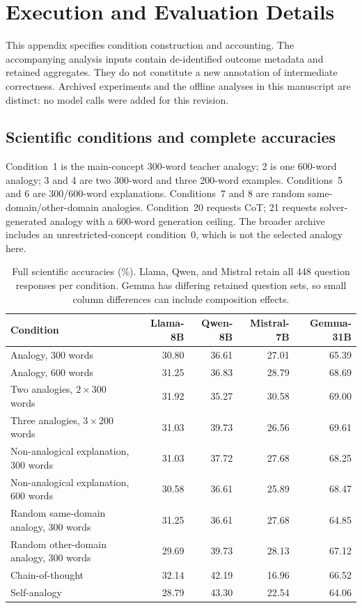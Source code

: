 \section{Execution and Evaluation Details}
\label{app:execution}
This appendix specifies condition construction and accounting. The accompanying analysis inputs contain de-identified outcome metadata and retained aggregates. They do not constitute a new annotation of intermediate correctness. Archived experiments and the offline analyses in this manuscript are distinct: no model calls were added for this revision.

\subsection{Scientific conditions and complete accuracies}
Condition~1 is the main-concept 300-word teacher analogy; 2 is one 600-word analogy; 3 and 4 are two 300-word and three 200-word examples. Conditions~5 and 6 are 300/600-word explanations. Conditions~7 and 8 are random same-domain/other-domain analogies. Condition~20 requests CoT; 21 requests solver-generated analogy with a 600-word generation ceiling. The broader archive includes an unrestricted-concept condition~0, which is not the selected analogy here.

\begin{table}[t]
\centering\small
\begin{tabular}{@{}lrrrr@{}}
\toprule
Condition & Llama-8B & Qwen-8B & Mistral-7B & Gemma-31B \\
\midrule
Analogy, 300 words & 30.80 & 36.61 & 27.01 & 65.39 \\
Analogy, 600 words & 31.25 & 36.83 & 28.79 & 68.69 \\
Two analogies, $2\times300$ words & 31.92 & 35.27 & 30.58 & 69.00 \\
Three analogies, $3\times200$ words & 31.03 & 39.73 & 26.56 & 69.61 \\
Non-analogical explanation, 300 words & 31.03 & 37.72 & 27.68 & 68.25 \\
Non-analogical explanation, 600 words & 30.58 & 36.61 & 25.89 & 68.47 \\
Random same-domain analogy, 300 words & 31.25 & 36.61 & 27.68 & 64.85 \\
Random other-domain analogy, 300 words & 29.69 & 39.73 & 28.13 & 67.12 \\
Chain-of-thought & 32.14 & 42.19 & 16.96 & 66.52 \\
Self-analogy & 28.79 & 43.30 & 22.54 & 64.06 \\
\bottomrule
\end{tabular}
\caption{Full scientific accuracies (\%). Llama, Qwen, and Mistral retain all 448 question responses per condition. Gemma has differing retained question sets, so small column differences can include composition effects.}
\label{tab:phase1}
\end{table}

